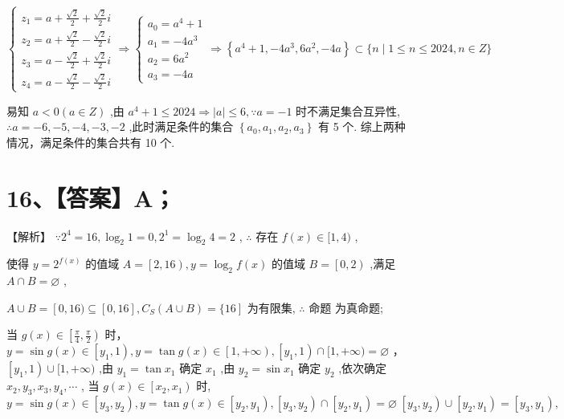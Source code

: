 \documentclass[10pt]{article}
\newcommand*\circled[1]{\tikz[baseline=(char.base)]{\node[shape=circle,draw,inner sep=1.5pt] (char) {\small #1};}}
\begin{document}
\[
\left\{  {\begin{array}{l} {z}_{1} = a + \frac{\sqrt{2}}{2} + \frac{\sqrt{2}}{2}i \\  {z}_{2} = a + \frac{\sqrt{2}}{2} - \frac{\sqrt{2}}{2}i \\  {z}_{3} = a - \frac{\sqrt{2}}{2} + \frac{\sqrt{2}}{2}i \\  {z}_{4} = a - \frac{\sqrt{2}}{2} - \frac{\sqrt{2}}{2}i \end{array} \Rightarrow  \left\{  {\begin{array}{l} {a}_{0} = {a}^{4} + 1 \\  {a}_{1} =  - 4{a}^{3} \\  {a}_{2} = 6{a}^{2} \\  {a}_{3} =  - {4a} \end{array} \Rightarrow  \left\{  {{a}^{4} + 1, - 4{a}^{3},6{a}^{2}, - {4a}}\right\}   \subset  \{ n \mid  1 \leq  n \leq  {2024},n \in  Z\} }\right. }\right.
\]

易知 \(a < 0\left( {a \in  Z}\right)\) ,由 \({a}^{4} + 1 \leq  {2024} \Rightarrow  \left| a\right|  \leq  6,\because a =  - 1\) 时不满足集合互异性, \(\therefore a =  - 6, - 5, - 4, - 3, - 2\) ,此时满足条件的集合 \(\left\{  {{a}_{0},{a}_{1},{a}_{2},{a}_{3}}\right\}\) 有 5 个. 综上两种情况，满足条件的集合共有 10 个.

\section*{16、【答案】A；}

【解析】 \circled{1}  \(\because {2}^{4} = {16},{\log }_{2}1 = 0,{2}^{1} = {\log }_{2}4 = 2\) , \(\therefore\) 存在 \(f\left( x\right)  \in  \lbrack 1,4)\) ,

使得 \(y = {2}^{f\left( x\right) }\) 的值域 \(A = \left\lbrack  {2,{16}}\right) ,y = {\log }_{2}f\left( x\right)\) 的值域 \(B = \left\lbrack  {0,2}\right)\) ,满足 \(A \cap  B = \varnothing\) ,

\(A \cup  B = \left\lbrack  {0,{16}) \subseteq  \left\lbrack  {0,{16}}\right\rbrack  ,{C}_{S}\left( {A \cup  B}\right)  = \{ {16}}\right\rbrack\) 为有限集, \(\therefore\) 命题 \circled{1} 为真命题;

 \circled{2}  当 \(g\left( x\right)  \in  \left\lbrack  {\frac{\pi }{4},\frac{\pi }{2}}\right)\) 时， \(y = \sin g\left( x\right)  \in  \left\lbrack  {{y}_{1},1}\right) ,y = \tan g\left( x\right)  \in  \left\lbrack  {1, + \infty }\right) ,\left\lbrack  {{y}_{1},1}\right)  \cap  \lbrack 1, + \infty ) = \varnothing\) ， \(\left\lbrack  {{y}_{1},1}\right)  \cup  \lbrack 1, + \infty )\) ,由 \({y}_{1} = \tan {x}_{1}\) 确定 \({x}_{1}\) ,由 \({y}_{2} = \sin {x}_{1}\) 确定 \({y}_{2}\) ,依次确定 \({x}_{2},{y}_{3},{x}_{3},{y}_{4},\cdots\) , 当 \(g\left( x\right)  \in  \left\lbrack  {{x}_{2},{x}_{1}}\right)\) 时, \(y = \sin g\left( x\right)  \in  \left\lbrack  {{y}_{3},{y}_{2}}\right) ,y = \tan g\left( x\right)  \in  \left\lbrack  {{y}_{2},{y}_{1}}\right) ,\left\lbrack  {{y}_{3},{y}_{2}}\right)  \cap  \left\lbrack  {{y}_{2},{y}_{1}}\right)  = \varnothing \; \left\lbrack  {{y}_{3},{y}_{2}}\right)  \cup  \left\lbrack  {{y}_{2},{y}_{1}}\right)  = \left\lbrack  {{y}_{3},{y}_{1}}\right) ,\)
\end{document}

